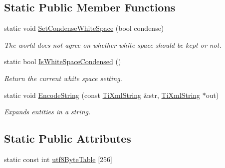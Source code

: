\subsection*{Static Public Member Functions}
\begin{DoxyCompactItemize}
\item 
static void \hyperlink{class_ti_xml_base_a0f799ec645bfb8d8a969e83478f379c1}{SetCondenseWhiteSpace} (bool condense)
\begin{DoxyCompactList}\small\item\em The world does not agree on whether white space should be kept or not. \end{DoxyCompactList}\item 
static bool \hyperlink{class_ti_xml_base_ad4b1472531c647a25b1840a87ae42438}{IsWhiteSpaceCondensed} ()
\begin{DoxyCompactList}\small\item\em Return the current white space setting. \end{DoxyCompactList}\item 
static void \hyperlink{class_ti_xml_base_a5acac5ac411d5d5ce28dd82d801fed24}{EncodeString} (const \hyperlink{class_ti_xml_string}{TiXmlString} \&str, \hyperlink{class_ti_xml_string}{TiXmlString} $\ast$out)
\begin{DoxyCompactList}\small\item\em Expands entities in a string. \end{DoxyCompactList}\end{DoxyCompactItemize}
\subsection*{Static Public Attributes}
\begin{DoxyCompactItemize}
\item 
static const int \hyperlink{class_ti_xml_base_ac8c86058137bdb4b413c3eca58f2d467}{utf8ByteTable} \mbox{[}256\mbox{]}
\end{DoxyCompactItemize}
